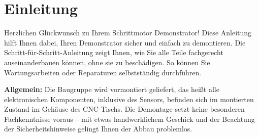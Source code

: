 %
%

\chapter{Einleitung}

Herzlichen Glückwunsch zu Ihrem Schrittmotor Demonstrator! Diese Anleitung hilft Ihnen dabei, Ihren Demonstrator sicher und einfach zu demontieren. Die Schritt-für-Schritt-Anleitung zeigt Ihnen, wie Sie alle Teile fachgerecht auseinanderbauen können, ohne sie zu beschädigen. So können Sie Wartungsarbeiten oder Reparaturen selbstständig durchführen.


\vspace{0.5cm}
\textbf{Allgemein:}
	Die Baugruppe wird vormontiert geliefert, das heißt alle
	elektronischen Komponenten, inklusive des Sensors, befinden sich im montierten
	Zustand im Gehäuse des CNC-Tischs.  Die Demontage setzt keine besonderen Fachkenntnisse voraus – mit etwas handwerklichem Geschick und der Beachtung der Sicherheitshinweise gelingt Ihnen der Abbau problemlos.


	\vspace{2cm}
	
	
	
	